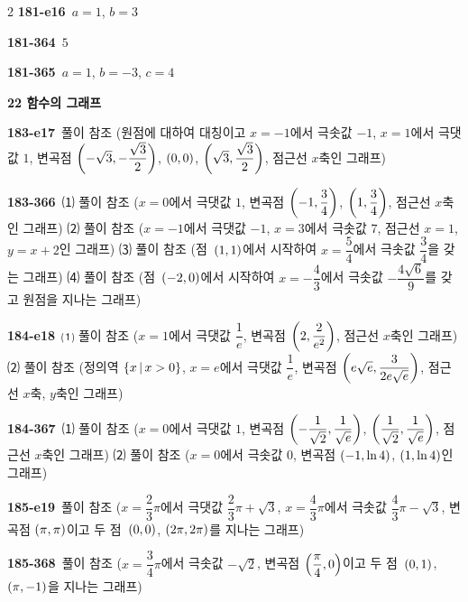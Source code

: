 \documentclass[10pt,a4paper]{article}
\begin{document}
\begin{multicols}{2}
\noindent\textbf{181-e16}\ $a=1$, $b=3$\par
\noindent\textbf{181-364}\ $5$\par
\noindent\textbf{181-365}\ $a=1$, $b=-3$, $c=4$\par
\noindent\textbf{22 함수의 그래프}\par\smallskip
\noindent\textbf{183-e17}\ 풀이 참조 (원점에 대하여 대칭이고 $x=-1$에서 극솟값 $-1$, $x=1$에서 극댓값 $1$, 변곡점 $\left(-\sqrt{3}{,}\mkern3mu\mathopen{}-\dfrac{\sqrt{3}}{2}\right)$, $(0{,}\mkern3mu\mathopen{}0)$, $\left(\sqrt{3}{,}\mkern3mu\mathopen{}\dfrac{\sqrt{3}}{2}\right)$, 점근선 $x$축인 그래프)\par
\noindent\textbf{183-366}\ ⑴ 풀이 참조 ($x=0$에서 극댓값 $1$, 변곡점 $\left(-1{,}\mkern3mu\mathopen{}\dfrac{3}{4}\right)$, $\left(1{,}\mkern3mu\mathopen{}\dfrac{3}{4}\right)$, 점근선 $x$축인 그래프) ⑵ 풀이 참조 ($x=-1$에서 극댓값 $-1$, $x=3$에서 극솟값 $7$, 점근선 $x=1$, $y=x+2$인 그래프) ⑶ 풀이 참조 (점~$(1{,}\mkern3mu\mathopen{}1)$에서 시작하여 $x=\dfrac{5}{4}$에서 극솟값 $\dfrac{3}{4}$을 갖는 그래프) ⑷ 풀이 참조 (점~$(-2{,}\mkern3mu\mathopen{}0)$에서 시작하여 $x=-\dfrac{4}{3}$에서 극솟값 $-\dfrac{4\sqrt{6}}{9}$를 갖고 원점을 지나는 그래프)\par
\noindent\textbf{184-e18}\ ⑴ 풀이 참조 ($x=1$에서 극댓값 $\dfrac{1}{e}$, 변곡점 $\left(2{,}\mkern3mu\mathopen{}\dfrac{2}{e^2}\right)$, 점근선 $x$축인 그래프) ⑵ 풀이 참조 (정의역 $\{x\mkern3mu |\mkern3mu x>0\}$, $x=e$에서 극댓값 $\dfrac{1}{e}$, 변곡점 $\left(e\sqrt{e}{,}\mkern3mu\mathopen{}\dfrac{3}{2e\sqrt{e}}\right)$, 점근선 $x$축, $y$축인 그래프)\par
\noindent\textbf{184-367}\ ⑴ 풀이 참조 ($x=0$에서 극댓값 $1$, 변곡점 $\left(-\dfrac{1}{\sqrt{2}}{,}\mkern3mu\mathopen{}\dfrac{1}{\sqrt{e}}\right)$, $\left(\dfrac{1}{\sqrt{2}}{,}\mkern3mu\mathopen{}\dfrac{1}{\sqrt{e}}\right)$, 점근선 $x$축인 그래프) ⑵ 풀이 참조 ($x=0$에서 극솟값 $0$, 변곡점 $(-1{,}\mkern3mu\mathopen{}\ln 4)$, $(1{,}\mkern3mu\mathopen{}\ln 4)$인 그래프)\par
\noindent\textbf{185-e19}\ 풀이 참조 ($x=\dfrac{2}{3}\pi$에서 극댓값 $\dfrac{2}{3}\pi+\sqrt{3}$, $x=\dfrac{4}{3}\pi$에서 극솟값 $\dfrac{4}{3}\pi-\sqrt{3}$, 변곡점 $(\pi{,}\mkern3mu\mathopen{}\pi)$이고 두 점~$(0{,}\mkern3mu\mathopen{}0)$, $(2\pi{,}\mkern3mu\mathopen{}2\pi)$를 지나는 그래프)\par
\noindent\textbf{185-368}\ 풀이 참조 ($x=\dfrac{3}{4}\pi$에서 극솟값 $-\sqrt{2}$, 변곡점 $\left(\dfrac{\pi}{4}{,}\mkern3mu\mathopen{}0\right)$이고 두 점~$(0{,}\mkern3mu\mathopen{}1)$, $(\pi{,}\mkern3mu\mathopen{}-1)$을 지나는 그래프)\par

\end{multicols}
\end{document}
